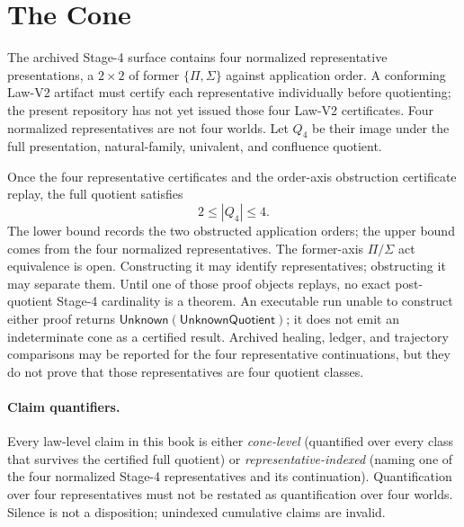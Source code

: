\section{The Cone}\label{sec:cone}

\begin{definition}
The archived Stage-4 surface contains four normalized representative
presentations, a \(2\times2\) of former \(\{\Pi,\Sigma\}\) against application
order. A conforming Law-V2 artifact must certify each representative
individually before quotienting; the present repository has not yet issued
those four Law-V2 certificates. Four normalized representatives are not four
worlds. Let \(Q_4\) be their image under the full presentation,
natural-family, univalent, and confluence quotient.
\end{definition}

\begin{proposition}
\label{prop:cone-structure}
Once the four representative certificates and the order-axis obstruction
certificate replay, the full quotient satisfies
\[
2\le |Q_4|\le4.
\]
The lower bound records the two obstructed application orders; the upper bound
comes from the four normalized representatives. The former-axis
\(\Pi/\Sigma\) act equivalence is open. Constructing it may identify
representatives; obstructing it may separate them. Until one of those proof
objects replays, no exact post-quotient Stage-4 cardinality is a theorem.
An executable run unable to construct either proof returns
\(\mathsf{Unknown}(\mathsf{UnknownQuotient})\); it does not emit an
indeterminate cone as a certified result.
Archived healing, ledger, and trajectory comparisons may be reported for the
four representative continuations, but they do not prove that those
representatives are four quotient classes.
\end{proposition}

\paragraph{Claim quantifiers.}
Every law-level claim in this book is either \emph{cone-level} (quantified
over every class that survives the certified full quotient) or
\emph{representative-indexed} (naming one of the four normalized Stage-4
representatives and its continuation). Quantification over four
representatives must not be restated as quantification over four worlds.
Silence is not a disposition; unindexed cumulative claims are invalid.

